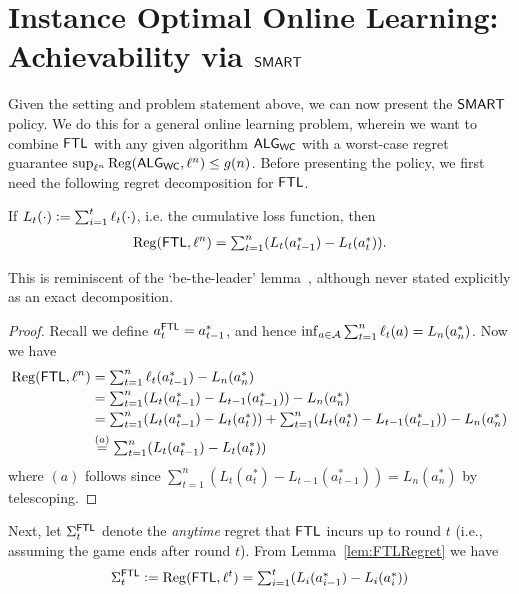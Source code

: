 \section{Instance Optimal Online Learning: Achievability via $\mathsf{SMART}$} \label{sec:twoapprox}

Given the setting and problem statement above, we can now present the $\mathsf{SMART}$ policy. 
We do this for a general online learning problem, wherein we want to combine $\mathsf{FTL}$ with any given algorithm $\mathsf{ALG}_{\mathsf{WC}}$ with a worst-case regret guarantee $
\sup_{\ell^n} \mathrm{Reg}(\mathsf{ALG}_{\mathsf{WC}}, \ell^n) \le g(n)
$. 
Before presenting the policy, we first need the following regret decomposition for $\mathsf{FTL}$. 
\begin{lemma} \label{lem:FTLRegret}
If $L_t(\cdot) \mathrel{\mathop{:}}= \sum_{i=1}^t \ell_t(\cdot)$, i.e. the cumulative loss function, then
\begin{align*} 
    \mathrm{Reg}(\mathsf{FTL}, \ell^n) = \textstyle\sum_{t=1}^n (L_t(a^*_{t-1}) - L_t(a^*_t)). 
\end{align*}
\end{lemma}
This is reminiscent of the `be-the-leader' lemma~\citep{kalai2005efficient,slivkins2019introduction}, although never stated explicitly as an exact decomposition. 
\begin{proof}
Recall we define $a^{\mathsf{FTL}}_t = a^*_{t-1}$, and hence $\inf_{a \in \mathcal{A}} \sum_{t=1}^n \ell_t(a)= L_n(a^*_n) $. Now we have 
    \begin{align*}
        \mathrm{Reg}(\mathsf{FTL}, \ell^n) 
        &= \textstyle\sum_{t=1}^n \ell_t(a^*_{t-1})  - L_n(a^*_n) \\
        &= \textstyle\sum_{t=1}^n (L_t(a^*_{t-1}) - L_{t-1}(a^*_{t-1})) -  L_n(a^*_n) \\
        &= \textstyle\sum_{t=1}^n (L_t(a^*_{t-1}) - L_t(a^*_t)) + \textstyle\sum_{t=1}^n (L_t(a^*_t) - L_{t-1}(a^*_{t-1})) - L_n(a^*_n) \\
        &\stackrel{(a)}{=} \textstyle\sum_{t=1}^n (L_t(a^*_{t-1}) - L_t(a^*_t))
    \end{align*}
    where $(a)$ follows since $\sum_{t=1}^n (L_t(a^*_t) - L_{t-1}(a^*_{t-1})) = L_n(a^*_n)$ by telescoping. 
\end{proof}
Next, let $\Sigma^{\mathsf{FTL}}_t$ denote the \emph{anytime} regret that $\mathsf{FTL}$ incurs up to round $t$ (i.e., assuming the game ends after round $t$). From Lemma~\ref{lem:FTLRegret} we have
\begin{align} 
\label{eq:FTLRegEquality}
 \Sigma^{\mathsf{FTL}}_t \mathrel{\mathop{:}}= \mathrm{Reg}(\mathsf{FTL}, \ell^t) = \textstyle\sum_{i=1}^t (L_i(a^*_{i-1}) - L_i(a^*_i)) 
\end{align}
